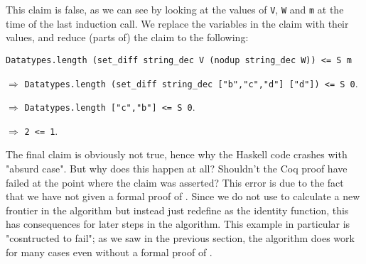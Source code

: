 This claim is false, as we can see by looking at the values of
\lstinline{V}, \lstinline{W} and \lstinline{m} at the time of the last induction call.
We replace the variables in the claim with their values, and reduce (parts of) the claim to the following:

\tabto{2em}
\lstinline{Datatypes.length (set_diff string_dec V (nodup string_dec W)) <= S m}

$\Rightarrow$
\tabto{2em}
\lstinline{Datatypes.length (set_diff string_dec ["b","c","d"] ["d"]) <= S 0}.

$\Rightarrow$
\tabto{2em}
\lstinline{Datatypes.length ["c","b"] <= S 0}.

$\Rightarrow$
\tabto{2em}
\lstinline{2 <= 1}.

The final claim is obviously not true, hence why the Haskell code crashes with "absurd case".
But why does this happen at all? Shouldn't the Coq proof have failed at the point where the claim was asserted?
This error is due to the fact that we have not given a formal proof of .
Since we do not use  to calculate a new frontier in the algorithm but instead just
redefine  as the identity function, this has consequences for later steps in the algorithm.
This example in particular is "cosntructed to fail"; as we saw in the previous section,
the algorithm does work for many cases even without a formal proof of .
